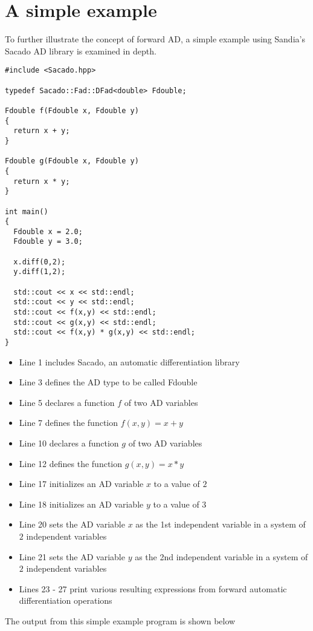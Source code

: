\documentclass{article}
\begin{document}
\section{A simple example}
To further illustrate the concept of forward AD, a simple example using
Sandia's Sacado AD library is examined in depth.
\begin{lstlisting}
#include <Sacado.hpp>

typedef Sacado::Fad::DFad<double> Fdouble;

Fdouble f(Fdouble x, Fdouble y)
{
  return x + y;
}

Fdouble g(Fdouble x, Fdouble y)
{
  return x * y;
}

int main()
{
  Fdouble x = 2.0;
  Fdouble y = 3.0;

  x.diff(0,2);
  y.diff(1,2);

  std::cout << x << std::endl;
  std::cout << y << std::endl;
  std::cout << f(x,y) << std::endl;
  std::cout << g(x,y) << std::endl;
  std::cout << f(x,y) * g(x,y) << std::endl;
}
\end{lstlisting}

\begin{itemize}
\item Line 1 includes Sacado, an automatic differentiation library
\item Line 3 defines the AD type to be called Fdouble
\item Line 5 declares a function $f$ of two AD variables
\item Line 7 defines the function $f(x,y) = x + y$
\item Line 10 declares a function $g$ of two AD variables
\item Line 12 defines the function $g(x,y) = x*y$
\item Line 17 initializes an AD variable $x$ to a value of $2$
\item Line 18 initializes an AD variable $y$ to a value of $3$
\item Line 20 sets the AD variable $x$ as the 1st independent variable in
a system of $2$ independent variables
\item Line 21 sets the AD variable $y$ as the 2nd independent variable in
a system of $2$ independent variables
\item Lines 23 - 27 print various resulting expressions from forward
automatic differentiation operations
\end{itemize}

The output from this simple example program is shown below
\end{document}
